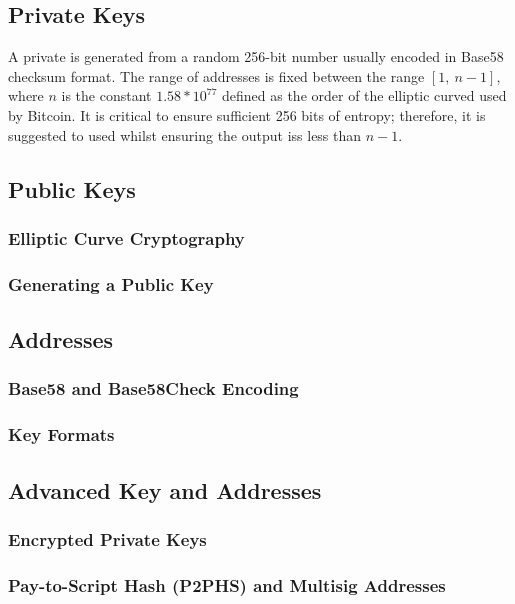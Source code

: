 \documentclass[english, 11pt]{article}
\begin{document}
		\subsection{Private Keys}
		A private is generated from a random 256-bit number usually encoded in Base58 checksum format. The range of addresses is fixed between the range $[1,\ n-1]$, where $n$ is the constant $1.58*10^{77}$ defined as the order of the elliptic curved used by Bitcoin. It is critical to ensure sufficient 256 bits of entropy; therefore, it is suggested to used  whilst ensuring the output iss less than $n-1$. 
		\subsection{Public Keys}
			\subsubsection{Elliptic Curve Cryptography}
			\subsubsection{Generating a Public Key}
		\subsection{Addresses}
			\subsubsection{Base58 and Base58Check Encoding}
			\subsubsection{Key Formats}
		\subsection{Advanced Key and Addresses}
			\subsubsection{Encrypted Private Keys}
			\subsubsection{Pay-to-Script Hash (P2PHS) and Multisig Addresses}
\end{document}
